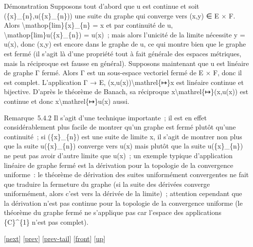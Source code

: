 \documentclass[]{article}
\begin{document}
Démonstration Supposons tout d'abord que u est continue et soit
(\{x\}\_\{n\},u(\{x\}\_\{n\})) une suite du graphe qui converge vers
(x,y) ∈ E × F. Alors \textbackslash{}mathop\{lim\}\{x\}\_\{n\} = x et
par continuité de u, \textbackslash{}mathop\{lim\}u(\{x\}\_\{n\}) =
u(x)~; mais alors l'unicité de la limite nécessite y = u(x), donc (x,y)
est encore dans le graphe de u, ce qui montre bien que le graphe est
fermé (il s'agit là d'une propriété tout à fait générale des espaces
métriques, mais la réciproque est fausse en général). Supposons
maintenant que u est linéaire de graphe Γ fermé. Alors Γ est un
sous-espace vectoriel fermé de E × F, donc il est complet. L'application
Γ → E, (x,u(x))\textbackslash{}mathrel\{↦\}x est linéaire continue et
bijective. D'après le théorème de Banach, sa réciproque
x\textbackslash{}mathrel\{↦\}(x,u(x)) est continue et donc
x\textbackslash{}mathrel\{↦\}u(x) aussi.

Remarque~5.4.2 Il s'agit d'une technique importante~; il est en effet
considérablement plus facile de montrer qu'un graphe est fermé plutôt
qu'une continuité~; si (\{x\}\_\{n\}) est une suite de limite x, il
s'agit de montrer non plus que la suite u(\{x\}\_\{n\}) converge vers
u(x) mais plutôt que la suite u(\{x\}\_\{n\}) ne peut pas avoir d'autre
limite que u(x)~; un exemple typique d'application linéaire de graphe
fermé est la dérivation pour la topologie de la convergence uniforme~:
le théorème de dérivation des suites uniformément convergentes ne fait
que traduire la fermeture du graphe (si la suite des dérivées converge
uniformément, alors c'est vers la dérivée de la limite)~; attention
cependant que la dérivation n'est pas continue pour la topologie de la
convergence uniforme (le théorème du graphe fermé ne s'applique pas car
l'espace des applications \{C\}\^{}\{1\} n'est pas complet).

{[}\href{coursse31.html}{next}{]} {[}\href{coursse29.html}{prev}{]}
{[}\href{coursse29.html\#tailcoursse29.html}{prev-tail}{]}
{[}\href{coursse30.html}{front}{]}
{[}\href{coursch6.html\#coursse30.html}{up}{]}
\end{document}
